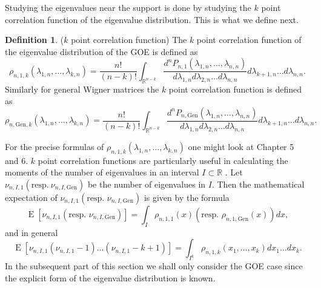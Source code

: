\documentclass[12pt]{article}
\numberwithin{equation}{section}
\numberwithin{equation}{section}
\theoremstyle{definition}
\newtheorem{definition}{Definition}[section]
\DeclareMathOperator{\E}{E} \DeclareMathOperator{\var}{Var}
\renewcommand{\1}{\bf 1}
\begin{document}
\noindent 
Studying the eigenvalues near the support is done by studying the $k$ point correlation function of the eigenvalue distribution. This is what we define next.
\begin{definition}($k$ point correlation function)
The $k$ point correlation function of the eigenvalue distribution of the GOE is defined as 
\begin{equation}
\rho_{n,1,k}(\lambda_{1,n},\ldots, \lambda_{k,n})= \frac{n!}{(n-k)!}\int_{\mathbb{R}^{n-k}} \frac{d^{n}P_{n,1}(\lambda_{1,n},\ldots, \lambda_{n,n})}{d\lambda_{1,n}d\lambda_{2,n}\ldots d\lambda_{n,n}} d \lambda_{k+1,n} \ldots d\lambda_{n,n}.
\end{equation} 
Similarly for general Wigner matrices the $k$ point correlation function is defined as 
\begin{equation}
\rho_{n,\mathrm{Gen},k}(\lambda_{1,n},\ldots, \lambda_{k,n})= \frac{n!}{(n-k)!}\int_{\mathbb{R}^{n-k}} \frac{d^{n}P_{n,\mathrm{Gen}}(\lambda_{1,n},\ldots, \lambda_{n,n})}{d\lambda_{1,n}d\lambda_{2,n}\ldots d\lambda_{n,n}} d \lambda_{k+1,n} \ldots d\lambda_{n,n}.
\end{equation}
\end{definition} 
For the precise formulas of $\rho_{n,1,k}(\lambda_{1,n},\ldots, \lambda_{k,n})$ one might look at \citet{mehta2004random} Chapter 5 and 6. $k$ point correlation functions are
particularly useful in calculating the moments of the number of eigenvalues
in an interval $I \subset \mathbb{R}$ . Let $\nu_{n,I,1}(\text{resp.} ~ \nu_{n,I,\mathrm{Gen}})$ be the number of eigenvalues in $I$. Then the mathematical expectation of $\nu_{n,I,1}(\text{resp. } \nu_{n,I,\mathrm{Gen}})$
is given by the formula
\begin{equation}
\E\left[ \nu_{n,I,1}(\text{resp. } \nu_{n,I,\mathrm{Gen}}) \right] = \int_{I} \rho_{n,1,1}(x)(\text{resp. } \rho_{n,1,\mathrm{Gen}}(x)) dx,
\end{equation}
and in general 
\begin{equation}
\E\left[ \nu_{n,I,1}(\nu_{n,I,1}-1)\ldots (\nu_{n,I,1}-k+1)\right]= \int_{I^{k}} \rho_{n,1,k}(x_{1},\ldots, x_{k}) dx_{1} \ldots dx_{k}.
\end{equation}
In the subsequent part of this section we shall only consider the GOE case since the explicit form of the eigenvalue distribution is known.
\end{document}
